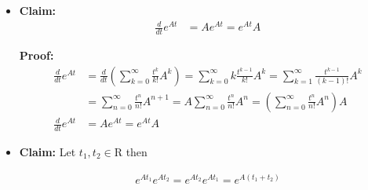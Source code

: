 \documentclass[twoside]{article}
\begin{document}
\begin{itemize}

 \item \textbf{Claim:}
%
\begin{align*}
  \frac{d}{d t} e^{A t} &= A e^{A t} = e^{A t} A
\end{align*}

\textbf{Proof:} 
%
\begin{align*}
 	\frac{d}{dt} e^{A t} &= \frac{d}{dt} \left( \sum\limits_{k=0}^{\infty} \frac{t^{k}}{k!} A^k \right) =
	\sum\limits_{k=0}^{\infty} k \frac{t^{k-1}}{k!} A^k = \sum\limits_{k=1}^{\infty} \frac{t^{k-1}}{(k-1)!} A^k \\
	&= \sum\limits_{n=0}^{\infty} \frac{t^{n}}{n!} A^{n+1} = A \sum\limits_{n=0}^{\infty} \frac{t^{n}}{n!} A^{n}   = \left( \sum\limits_{n=0}^{\infty} \frac{t^{n}}{n!} A^{n} \right) A
	\\
	\frac{d}{dt} e^{A t}  &= A e^{A t} = e^{A t} A
\end{align*}

\item \textbf{Claim:} Let $t_1 , t_2 \in \mathrm{R}$ then

\begin{align*}
  e^{A t_1} e^{A t_2} = e^{A t_2} e^{A t_1} = e^{A \left( t_1 + t_2 \right)}
\end{align*}


\end{itemize}
\end{document}
